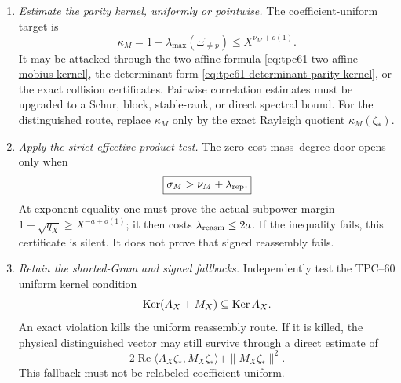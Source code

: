 \begin{enumerate}[label=\textbf{Door \Alph*.},leftmargin=3.8em]
 \item \emph{Estimate the parity kernel, uniformly or pointwise.}
       The coefficient-uniform target is
       \begin{equation}
        \kappa_M
        =1+\lambda_{\max}(\Xi_{\ne p})
        \le X^{\nu_M+o(1)}.
        \label{eq:tpc61-next-uniform-parity-target}
       \end{equation}
       It may be attacked through the two-affine formula
       \eqref{eq:tpc61-two-affine-mobius-kernel}, the determinant form
       \eqref{eq:tpc61-determinant-parity-kernel}, or the exact collision
       certificates.  Pairwise correlation estimates must be upgraded to
       a Schur, block, stable-rank, or direct spectral bound.  For the
       distinguished route, replace \(\kappa_M\) only by the exact
       Rayleigh quotient \(\kappa_M(\zeta_*)\).

 \item \emph{Apply the strict effective-product test.}
       The zero-cost mass--degree door opens only when
       \begin{equation}
        \boxed{\sigma_M>\nu_M+\lambda_{\rm rep}.}
        \label{eq:tpc61-next-effective-product-test}
       \end{equation}
       At exponent equality one must prove the actual subpower margin
       \(1-\sqrt{q_X}\ge X^{-a+o(1)}\); it then costs
       \(\lambda_{\rm reasm}\le2a\).  If the inequality fails, this
       certificate is silent.  It does not prove that signed reassembly
       fails.

 \item \emph{Retain the shorted-Gram and signed fallbacks.}
       Independently test the TPC--60 uniform kernel condition
       \begin{equation}
        \operatorname{Ker}(A_X+M_X)\subseteq\operatorname{Ker} A_X.
        \label{eq:tpc61-next-shorted-kernel-test}
       \end{equation}
       An exact violation kills the uniform reassembly route.  If it is
       killed, the physical distinguished vector may still survive through
       a direct estimate of
       \begin{equation}
        2\operatorname{Re}
          \langle A_X\zeta_*,M_X\zeta_*\rangle
        +\|M_X\zeta_*\|^2.
        \label{eq:tpc61-next-signed-fallback}
       \end{equation}
       This fallback must not be relabeled coefficient-uniform.


\end{enumerate}
